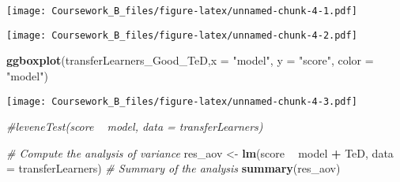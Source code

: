 \documentclass[]{article}
\newenvironment{Shaded}{\begin{snugshade}}{\end{snugshade}}
\newcommand{\KeywordTok}[1]{\textcolor[rgb]{0.13,0.29,0.53}{\textbf{#1}}}
\newcommand{\DataTypeTok}[1]{\textcolor[rgb]{0.13,0.29,0.53}{#1}}
\newcommand{\StringTok}[1]{\textcolor[rgb]{0.31,0.60,0.02}{#1}}
\newcommand{\CommentTok}[1]{\textcolor[rgb]{0.56,0.35,0.01}{\textit{#1}}}
\newcommand{\OperatorTok}[1]{\textcolor[rgb]{0.81,0.36,0.00}{\textbf{#1}}}
\newcommand{\NormalTok}[1]{#1}
\begin{document}
\texttt{[image: Coursework\_B\_files/figure-latex/unnamed-chunk-4-1.pdf]}

\begin{Shaded}
\end{Shaded}

\texttt{[image: Coursework\_B\_files/figure-latex/unnamed-chunk-4-2.pdf]}

\begin{Shaded}
\begin{Highlighting}[]
\KeywordTok{ggboxplot}\NormalTok{(transferLearners_Good_TeD,}\DataTypeTok{x =} \StringTok{"model"}\NormalTok{, }\DataTypeTok{y =} \StringTok{"score"}\NormalTok{, }\DataTypeTok{color =} \StringTok{"model"}\NormalTok{)}
\end{Highlighting}
\end{Shaded}

\texttt{[image: Coursework\_B\_files/figure-latex/unnamed-chunk-4-3.pdf]}

\begin{Shaded}
\begin{Highlighting}[]
\CommentTok{#leveneTest(score ~ model, data = transferLearners)}

\CommentTok{# Compute the analysis of variance}
\NormalTok{res_aov <-}\StringTok{ }\KeywordTok{lm}\NormalTok{(score }\OperatorTok{~}\StringTok{ }\NormalTok{model }\OperatorTok{+}\StringTok{ }\NormalTok{TeD, }\DataTypeTok{data =}\NormalTok{ transferLearners)}
\CommentTok{# Summary of the analysis}
\KeywordTok{summary}\NormalTok{(res_aov)}
\end{Highlighting}
\end{Shaded}
\end{document}
